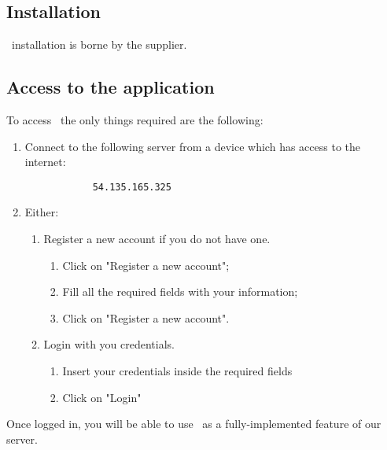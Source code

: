 \subsection{Installation}
\app\ installation is borne by the supplier.

\subsection{Access to the application}
To access \app\, the only things required are the following:
\begin{enumerate}
	\item Connect to the following  server from a device which has access to the 		
		  internet:
			\begin{lstlisting}
			54.135.165.325 
			\end{lstlisting}
	\item Either:
		  \begin{enumerate}
		  	\item Register a new account if you do not have one.
		  		\begin{enumerate}
		  			\item Click on "Register a new account";
		  			\item Fill all the required fields with your information;
		  			\item Click on "Register a new account".
		  		\end{enumerate}
		  		
		  	\item Login with you credentials.
		  		\begin{enumerate}
		  			\item Insert your credentials inside the required fields
		  			\item Click on "Login"
		  		\end{enumerate}
		  \end{enumerate}
\end{enumerate}

Once logged in, you will be able to use \app\ as a fully-implemented feature of our server.

\newpage